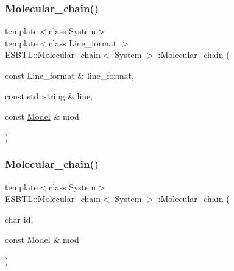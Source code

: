 \subsubsection{\texorpdfstring{Molecular\+\_\+chain()}{Molecular\_chain()}\hspace{0.1cm}{\footnotesize\ttfamily [1/2]}}
{\footnotesize\ttfamily template$<$class System$>$ \\
template$<$class Line\+\_\+format $>$ \\
\hyperlink{classESBTL_1_1Molecular__chain}{E\+S\+B\+T\+L\+::\+Molecular\+\_\+chain}$<$ System $>$\+::\hyperlink{classESBTL_1_1Molecular__chain}{Molecular\+\_\+chain} (\begin{DoxyParamCaption}\item[{const Line\+\_\+format \&}]{line\+\_\+format,  }\item[{const std\+::string \&}]{line,  }\item[{const \hyperlink{classESBTL_1_1Molecular__chain_a91de91fd0923cf2e00d947b76851be68}{Model} \&}]{mod }\end{DoxyParamCaption})\hspace{0.3cm}{\ttfamily [inline]}}

\mbox{\label{classESBTL_1_1Molecular__chain_a6a6ccadbd35d571991d63058f9d2b571}} 
\subsubsection{\texorpdfstring{Molecular\+\_\+chain()}{Molecular\_chain()}\hspace{0.1cm}{\footnotesize\ttfamily [2/2]}}
{\footnotesize\ttfamily template$<$class System$>$ \\
\hyperlink{classESBTL_1_1Molecular__chain}{E\+S\+B\+T\+L\+::\+Molecular\+\_\+chain}$<$ System $>$\+::\hyperlink{classESBTL_1_1Molecular__chain}{Molecular\+\_\+chain} (\begin{DoxyParamCaption}\item[{char}]{id,  }\item[{const \hyperlink{classESBTL_1_1Molecular__chain_a91de91fd0923cf2e00d947b76851be68}{Model} \&}]{mod }\end{DoxyParamCaption})\hspace{0.3cm}{\ttfamily [inline]}}



